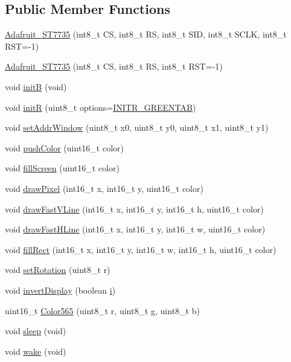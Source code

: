 \subsection*{Public Member Functions}
\begin{DoxyCompactItemize}
\item 
\hyperlink{class_adafruit___s_t7735_a920ee9f984e79dcddc6a60e306d9b446}{Adafruit\+\_\+\+S\+T7735} (int8\+\_\+t CS, int8\+\_\+t RS, int8\+\_\+t S\+ID, int8\+\_\+t S\+C\+LK, int8\+\_\+t R\+ST=-\/1)
\item 
\hyperlink{class_adafruit___s_t7735_aa1a91d0c5e8c2a28dbddffccea27dc9b}{Adafruit\+\_\+\+S\+T7735} (int8\+\_\+t CS, int8\+\_\+t RS, int8\+\_\+t R\+ST=-\/1)
\item 
void \hyperlink{class_adafruit___s_t7735_a71d8744ce7a27cd978ec64616d2ddae4}{initB} (void)
\item 
void \hyperlink{class_adafruit___s_t7735_a416b7a2b4748a90f8a33028522fa7504}{initR} (uint8\+\_\+t options=\hyperlink{_adafruit___s_t7735_8h_a8482c50b5e4da7ef9cc27ec7f16aa374}{I\+N\+I\+T\+R\+\_\+\+G\+R\+E\+E\+N\+T\+AB})
\item 
void \hyperlink{class_adafruit___s_t7735_ade48a8b2ba1e6375c5e3dbeaf84c44dd}{set\+Addr\+Window} (uint8\+\_\+t x0, uint8\+\_\+t y0, uint8\+\_\+t x1, uint8\+\_\+t y1)
\item 
void \hyperlink{class_adafruit___s_t7735_ac7e7977e3d664360f7f991cd7ae01035}{push\+Color} (uint16\+\_\+t color)
\item 
void \hyperlink{class_adafruit___s_t7735_af732d3d78239687718bb117de99418ca}{fill\+Screen} (uint16\+\_\+t color)
\item 
void \hyperlink{class_adafruit___s_t7735_af22a5ba7282850793f4943ba2d682af0}{draw\+Pixel} (int16\+\_\+t x, int16\+\_\+t y, uint16\+\_\+t color)
\item 
void \hyperlink{class_adafruit___s_t7735_a38de2e08911db493eb243ce2691e9c3a}{draw\+Fast\+V\+Line} (int16\+\_\+t x, int16\+\_\+t y, int16\+\_\+t h, uint16\+\_\+t color)
\item 
void \hyperlink{class_adafruit___s_t7735_ab2b8eb320bd19305c09b35be6d55d37e}{draw\+Fast\+H\+Line} (int16\+\_\+t x, int16\+\_\+t y, int16\+\_\+t w, uint16\+\_\+t color)
\item 
void \hyperlink{class_adafruit___s_t7735_a3556265c5b017cd2cdceb1f34e9bc421}{fill\+Rect} (int16\+\_\+t x, int16\+\_\+t y, int16\+\_\+t w, int16\+\_\+t h, uint16\+\_\+t color)
\item 
void \hyperlink{class_adafruit___s_t7735_aae15fa049e0aff62d58d8773182a87de}{set\+Rotation} (uint8\+\_\+t r)
\item 
void \hyperlink{class_adafruit___s_t7735_a2c7ac7e15a2b867273d4ddee5dde11c5}{invert\+Display} (boolean \hyperlink{dac___m_c_p4725_8cpp_ac2e790a754ca79a6e539135dc35f4fc0}{i})
\item 
uint16\+\_\+t \hyperlink{class_adafruit___s_t7735_aef9c4f90acb18082a51b18490feb3c0b}{Color565} (uint8\+\_\+t r, uint8\+\_\+t g, uint8\+\_\+t b)
\item 
void \hyperlink{class_adafruit___s_t7735_ac945c3d179185563dc2bfae09ac35375}{sleep} (void)
\item 
void \hyperlink{class_adafruit___s_t7735_aba13f16e02307bca2b422a8b8e16b754}{wake} (void)
\end{DoxyCompactItemize}
